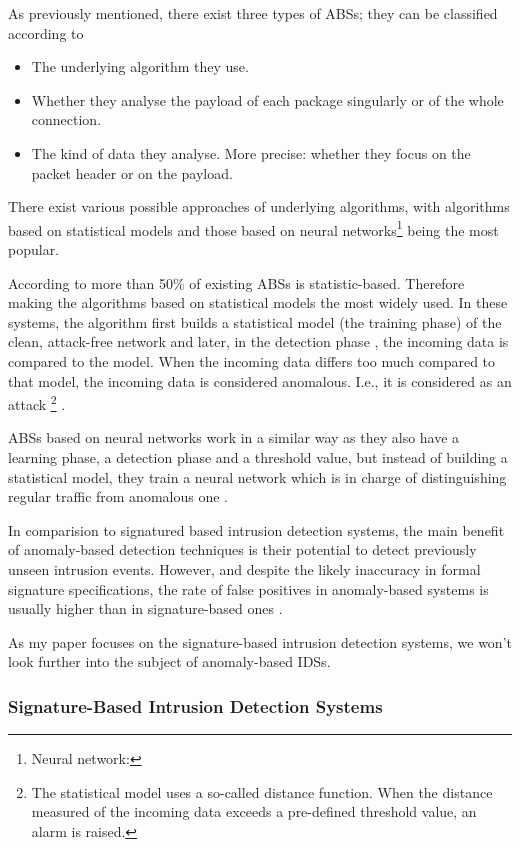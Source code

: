 As previously mentioned, there exist three types of ABSs; they can be classified according to
\begin{itemize}
\item The underlying algorithm they use.
\item Whether they analyse the payload of each package singularly or of the whole connection.
\item The kind of data they analyse. More precise: whether they focus on the packet header or on the payload.
\end{itemize}
There exist various possible approaches of underlying algorithms, with algorithms based on statistical models and those based on neural networks\footnote{Neural network:} being the most popular. 

According to \citep{Debar} more than 50\% of existing ABSs is statistic-based. Therefore making the algorithms based on statistical models the most widely used. In these systems, the algorithm first builds a statistical model (the training phase) of the clean, attack-free network and later, in the detection phase , the incoming data is compared to the model. When the incoming data differs too much compared to that model, the incoming data is considered anomalous. I.e., it is considered as an attack \footnote{The statistical model uses a so-called distance function. When the distance measured of the incoming data exceeds a pre-defined threshold value, an alarm is raised.} \citep{Roberto}.

ABSs based on neural networks work in a similar way as they also have a learning phase, a detection phase and a threshold value, but instead of building a statistical model, they train a neural network which is in charge of distinguishing regular traffic from anomalous one \citep{Roberto}. 

In comparision to signatured based intrusion detection systems, the main benefit of anomaly-based detection techniques is their potential to detect previously unseen
intrusion events. However, and despite the likely inaccuracy in formal signature specifications, the rate of false positives in anomaly-based systems is usually higher than in signature-based ones \citep{CandS}.

As my paper focuses on the signature-based intrusion detection systems, we won't look further into the subject of anomaly-based IDSs.

\subsubsection{Signature-Based Intrusion Detection Systems}

